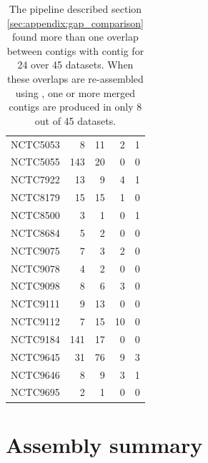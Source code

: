 \documentclass[../../main.tex]{subfiles}
\begin{document}
\begin{table}[!htbp]
\begin{tabular}{l|rr|rr}
NCTC5053	&	8	&	11	&	2	&	1	\\
NCTC5055	&	143	&	20	&	0	&	0	\\
NCTC7922	&	13	&	9	&	4	&	1	\\
NCTC8179	&	15	&	15	&	1	&	0	\\
NCTC8500	&	3	&	1	&	0	&	1	\\
NCTC8684	&	5	&	2	&	0	&	0	\\
NCTC9075	&	7	&	3	&	2	&	0	\\
NCTC9078	&	4	&	2	&	0	&	0	\\
NCTC9098	&	8	&	6	&	3	&	0	\\
NCTC9111	&	9	&	13	&	0	&	0	\\
NCTC9112	&	7	&	15	&	10	&	0	\\
NCTC9184	&	141	&	17	&	0	&	0	\\
NCTC9645	&	31	&	76	&	9	&	3	\\
NCTC9646	&	8	&	9	&	3	&	1	\\
NCTC9695	&	2	&	1	&	0	&	0	\\
 \hline
    \end{tabular}
    \caption{
    The pipeline described section \ref{sec:appendix:gap_comparison} found more than one overlap between \canu contigs with \miniasm contig for 24 over 45 datasets. When these overlaps are re-assembled  using \miniasm, one or more merged contigs are produced in only 8 out of 45 datasets.
    }
    \label{tab:appendix:gap_comparison}
\end{table}


\newpage

\section{Assembly summary ~\label{sec:appendix_assembly_summary}}
\end{document}
